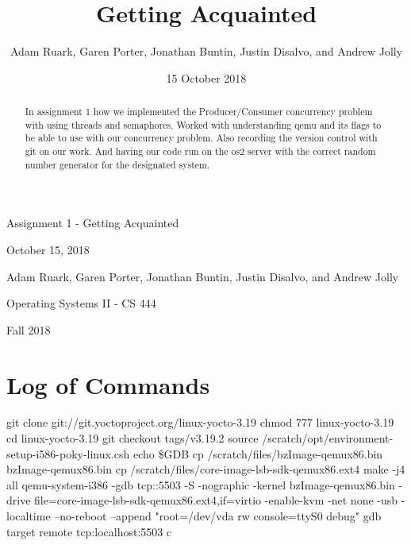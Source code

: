 \documentclass[onecolumn, draftclsnofoot,10pt, compsoc]{article}
\title{Getting Acquainted}
\author{Adam Ruark, Garen Porter, Jonathan Buntin, Justin Disalvo, and Andrew Jolly}
\date{15 October 2018}
\begin{document}
\begin{titlepage}
    \centering
    \scshape{
                \huge Assignment 1 - Getting Acquainted \par
                {October 15, 2018}\par
                \vspace{.5in}
                \par{Adam Ruark, Garen Porter, Jonathan Buntin, Justin Disalvo, and Andrew Jolly}
                \par\vspace{.2in}
                \par {Operating Systems II - CS 444}
                \vspace{.5in}
                \par {Fall 2018}
                \vspace{50pt}
            }
    \begin{abstract}
    \noindent In assignment 1 how we implemented the Producer/Consumer concurrency problem with using threads and semaphores. Worked with understanding qemu and its flags to be able to use with our concurrency problem. Also recording the version control with git on our work. And having our code run on the os2 server with the correct random number generator for the designated system.
    \end{abstract}
    \newpage
\end{titlepage}

\section{Log of Commands}
    git clone git://git.yoctoproject.org/linux-yocto-3.19\newline
    chmod 777 linux-yocto-3.19\newline
    cd linux-yocto-3.19\newline
    git checkout tags/v3.19.2\newline
    source /scratch/opt/environment-setup-i586-poky-linux.csh\newline
    echo \$GDB\newline
    cp /scratch/files/bzImage-qemux86.bin bzImage-qemux86.bin\newline
    cp /scratch/files/core-image-lsb-sdk-qemux86.ext4\newline
    make -j4 all\newline
    qemu-system-i386 -gdb tcp::5503 -S -nographic -kernel bzImage-qemux86.bin -drive file=core-image-lsb-sdk-qemux86.ext4,if=virtio -enable-kvm -net none -usb -localtime --no-reboot --append "root=/dev/vda rw console=ttyS0 debug"\newline
    gdb\newline
    target remote tcp:localhost:5503\newline
    c\newline
    
\end{document}
